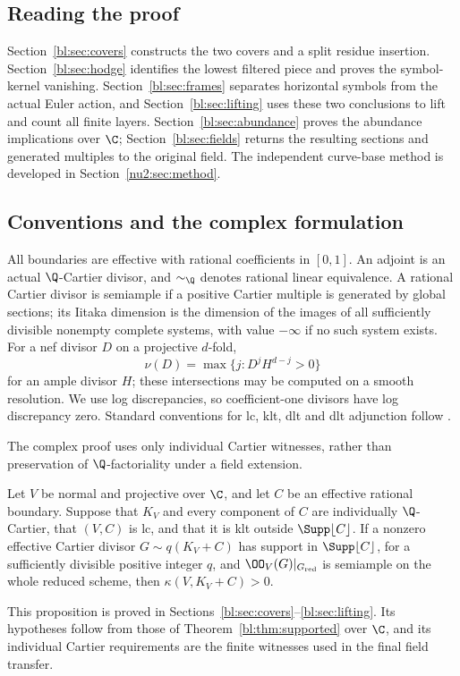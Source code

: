 \subsection*{Reading the proof}
Section~\ref{bl:sec:covers} constructs the two covers and a split residue
insertion. Section~\ref{bl:sec:hodge} identifies the lowest filtered
piece and proves the symbol-kernel vanishing. Section~\ref{bl:sec:frames}
separates horizontal symbols from the actual Euler action, and
Section~\ref{bl:sec:lifting} uses these two conclusions to lift and
count all finite layers. Section~\ref{bl:sec:abundance} proves the
abundance implications over $\C$; Section~\ref{bl:sec:fields} returns
the resulting sections and generated multiples to the original field.
The independent curve-base method is developed in
Section~\ref{nu2:sec:method}.

\subsection*{Conventions and the complex formulation}
All boundaries are effective with rational coefficients in $[0,1]$.
An adjoint is an actual $\Q$-Cartier divisor, and $\sim_{\Q}$ denotes
rational linear equivalence. A rational Cartier divisor is semiample
if a positive Cartier multiple is generated by global sections; its
Iitaka dimension is the dimension of the images of all sufficiently
divisible nonempty complete systems, with value $-\infty$ if no such
system exists. For a nef divisor $D$ on a projective $d$-fold,
\[
 \nu(D)=\max\{j:D^jH^{d-j}>0\}
\]
for an ample divisor $H$; these intersections may be computed on a
smooth resolution. We use log discrepancies, so coefficient-one
divisors have log discrepancy zero. Standard conventions for lc,
klt, dlt and dlt adjunction follow \cite{Kollar2013}.

The complex proof uses only individual Cartier witnesses, rather than
preservation of $\Q$-factoriality under a field extension.
\begin{proposition}
\label{bl:prop:complex-supported}
Let $V$ be normal and projective over $\C$, and let $C$ be an
effective rational boundary. Suppose that $K_V$ and every component
of $C$ are individually $\Q$-Cartier, that $(V,C)$ is lc, and that
it is klt outside $\Supp\lfloor C\rfloor$. If a nonzero effective
Cartier divisor $G\sim q(K_V+C)$ has support in
$\Supp\lfloor C\rfloor$, for a sufficiently divisible positive
integer $q$, and $\OO_V(G)|_{G_{\mathrm{red}}}$ is semiample on the
whole reduced scheme, then $\kappa(V,K_V+C)>0$.
\end{proposition}
This proposition is proved in Sections~\ref{bl:sec:covers}--\ref{bl:sec:lifting}.
Its hypotheses follow from those of Theorem~\ref{bl:thm:supported}
over $\C$, and its individual Cartier requirements are the finite
witnesses used in the final field transfer.
